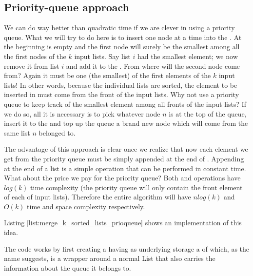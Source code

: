 \subsection{Priority-queue approach}
\label{merge_k_sorted_lists:sec:priorityqueue}
We can do way better than quadratic time if we are clever in using a priority queue. 
What we will try to do here is to insert one node at a time into the . 
At the beginning  is empty and the first node will surely be the smallest among all the first nodes of the $k$ input lists. Say list $i$ had the smallest element; we now remove it from list $i$ and add it to the .
From where will the second node come from? Again it must be one (the smallest) of the first elements of the $k$ input lists! 
In other words, because the individual lists are sorted, the  element to be inserted in  must come from the front of the input lists.
Why not use a priority queue to keep track of the smallest element among all fronts of the input lists? If we do so, all it is necessary is to pick whatever node $n$ is at the top of the queue, insert it to the  and top up the queue a brand new node which will come from the same list $n$ belonged to.

The advantage of this approach is clear once we realize that now each element we get from the priority queue must be simply appended at the end of . Appending at the end of a list is a simple operation that can be performed in constant time.
What about the price we pay for the priority queue? Both  and  operations have $log(k)$ time complexity (the priority queue will only contain the front element of each of input lists). Therefore the entire algorithm will have $nlog(k)$ and $O(k)$ time and space complexity respectively.

Listing \ref{list:merge_k_sorted_lists_prioqueue} shows an implementation of this idea.



The code works by first creating a  having as underlying storage a  of  which, as the name suggests, is a wrapper around a normal List  that also carries the information about the queue it belongs to.

